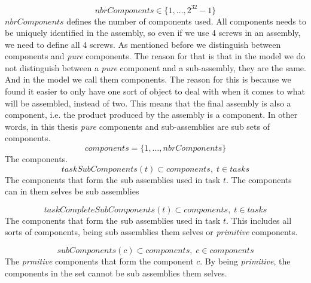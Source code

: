 \documentclass[10pt,a4paper]{report}
\begin{document}
\begin{equation}\label{eq:6}
nbrComponents \in \{1 , \ldots , 2^{32}-1\}
\end{equation}
$nbrComponents$ defines the number of components used. All components needs to be uniquely identified in the assembly, so even if we use 4 screws in an assembly, we need to define all 4 screws. As mentioned before we distinguish between components and \emph{pure} components. The reason for that is that in the model we do not distinguish between a \emph{pure} component and a sub-assembly, they are the same. And in the model we call them components. The reason for this is because we found it easier to only have one sort of object to deal with when it comes to what will be assembled, instead of two. This means that the final assembly is also a component, i.e. the product produced by the assembly is a component. In other words, in this thesis \emph{pure} components and sub-assemblies are sub sets of components.
\begin{equation}\label{eq:13}
components = \{1 , \ldots , nbrComponents\}\end{equation}
The components.
\begin{equation}\label{eq:53}
taskSubComponents(t) \subset components, \; t \in tasks\end{equation}
The components that form the sub assemblies used in task $t$. The components can in them selves be sub assemblies

\begin{equation}\label{eq:54}
taskCompleteSubComponents(t) \subset components, \; t \in tasks\end{equation}
The components that form the sub assemblies used in task $t$. This includes all sorts of components, being sub assemblies them selves or \emph{primitive} components.

\begin{equation}\label{eq:55}
subComponents(c) \subset components, \; c \in components\end{equation}
The \emph{prmitive} components that form the component $c$. By being \emph{primitive}, the components in the set cannot be sub assemblies them selves.
\end{document}
